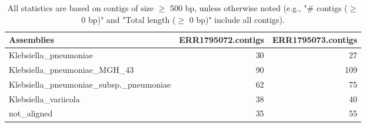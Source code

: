 \documentclass[12pt,a4paper]{article}
\begin{document}
\begin{table}[ht]
\begin{center}
\caption{All statistics are based on contigs of size $\geq$ 500 bp, unless otherwise noted (e.g., "\# contigs ($\geq$ 0 bp)" and "Total length ($\geq$ 0 bp)" include all contigs).}
\begin{tabular}{|l*{2}{|r}|}
\hline
Assemblies & ERR1795072.contigs & ERR1795073.contigs \\ \hline
Klebsiella\_pneumoniae & 30 & 27 \\ \hline
Klebsiella\_pneumoniae\_MGH\_43 & 90 & 109 \\ \hline
Klebsiella\_pneumoniae\_subsp.\_pneumoniae & 62 & 75 \\ \hline
Klebsiella\_variicola & 38 & 40 \\ \hline
not\_aligned & 35 & 55 \\ \hline
\end{tabular}
\end{center}
\end{table}
\end{document}
